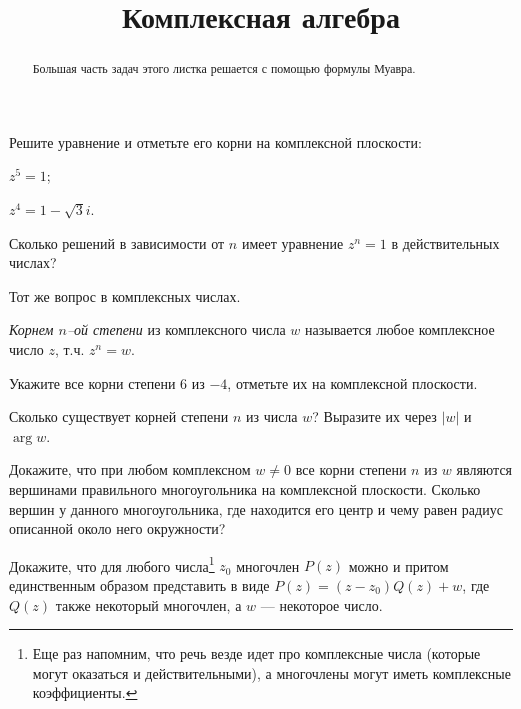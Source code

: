\documentclass[a4paper, 12pt, num=22]{listok}
\begin{document}
\title{Комплексная алгебра}
\maketitle{}
\begin{abstract}
	Большая часть задач этого листка решается с помощью формулы Муавра.
\end{abstract}
\begin{problem}
	Решите уравнение и отметьте его корни на комплексной плоскости:
	\begin{multienum}{2}
		\item $z^5 = 1$;
		\item $z^4 = 1 - \sqrt3i$.
	\end{multienum}
\end{problem}
\begin{problem}
\begin{probparts}
	\item Сколько решений в зависимости от $n$ имеет уравнение $z^n = 1$ в действительных числах?
	\item Тот же вопрос в комплексных числах.
\end{probparts}
\end{problem}
\begin{definition}
	\textit{Корнем $n$--ой степени} из комплексного числа $w$ называется любое комплексное число $z$, т.ч. $z^n = w$.
\end{definition}
\begin{problem}
	Укажите все корни степени $6$ из $-4$, отметьте их на комплексной плоскости.
\end{problem}
\begin{problem}
	Сколько существует корней степени $n$ из числа $w$? Выразите их через $|w|$ и $\arg w$.
\end{problem}
\begin{problem}
	Докажите, что при любом комплексном $w \ne 0$ все корни степени $n$ из $w$ являются
	вершинами правильного многоугольника на комплексной плоскости.
	Сколько вершин у данного многоугольника,
	где находится его центр и чему равен радиус описанной около него окружности?
\end{problem}
\begin{problem}
	Докажите, что для любого числа\footnote{Еще раз напомним, что речь везде идет про комплексные числа
	(которые могут оказаться и действительными), а многочлены могут иметь комплексные коэффициенты.}
	$z_0$ многочлен $P(z)$ можно и притом единственным образом представить в виде $P(z) = (z - z_0)Q(z) + w$,
	где $Q(z)$ также некоторый многочлен, а $w$ --- некоторое число.
\end{problem}
\end{document}
